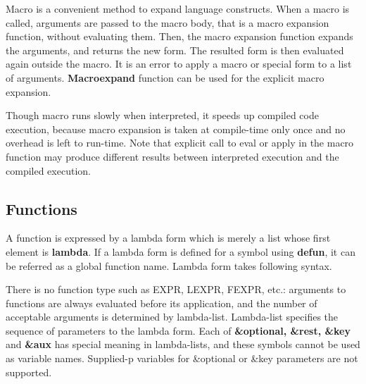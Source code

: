 Macro is a convenient method to expand language constructs.
When a macro is called, arguments are passed to the macro body, that is a
macro expansion function, without evaluating them.
Then, the macro expansion function expands the arguments,
and returns the new form.
The resulted form is then evaluated again outside the macro.
It is an error to apply a macro or special form to a list of arguments.
{\bf Macroexpand} function can be used for the explicit macro expansion.

Though macro runs slowly when interpreted,
it speeds up compiled code execution,
because macro expansion is taken at compile-time only once
and no overhead is left to run-time.
Note that explicit call to eval or apply in the macro function may
produce different results between interpreted execution
and the compiled execution.

\subsection{Functions}

A function is expressed by a lambda form which is merely a list
whose first element is {\bf lambda}.
If a lambda form is defined for a symbol using {\bf defun}, it can be referred
as a global function name.
Lambda form takes following syntax.


There is no function type such as EXPR, LEXPR, FEXPR, etc.:
arguments to functions are always evaluated before its application,
and the number of acceptable arguments is determined by lambda-list.
Lambda-list specifies the sequence of parameters to the lambda form.
Each of {\bf \&optional, \&rest, \&key } and {\bf \&aux} has special
meaning in lambda-lists, and these symbols cannot be used as variable
names.
Supplied-p variables for \&optional or \&key parameters are not supported.


